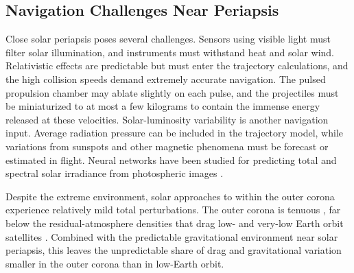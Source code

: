 \documentclass{article}
\begin{document}
\subsection{Navigation Challenges Near Periapsis}\label{sec:periapsis_challenges}
Close solar periapsis poses several challenges. Sensors using visible light must filter solar illumination, and instruments must withstand heat and solar wind. Relativistic effects are predictable but must enter the trajectory calculations, and the high collision speeds demand extremely accurate navigation. The pulsed propulsion chamber may ablate slightly on each pulse, and the projectiles must be miniaturized to at most a few kilograms to contain the immense energy released at these velocities. Solar-luminosity variability is another navigation input. Average radiation pressure can be included in the trajectory model, while variations from sunspots and other magnetic phenomena must be forecast or estimated in flight. Neural networks have been studied for predicting total and spectral solar irradiance from photospheric images \cite{muralikrishna2022solar}.

Despite the extreme environment, solar approaches to within the outer corona experience relatively mild total perturbations. The outer corona is tenuous \cite{corona_density}, far below the residual-atmosphere densities that drag low- and very-low Earth orbit satellites \cite{leo_orbit_perturbation_simulation}. Combined with the predictable gravitational environment near solar periapsis, this leaves the unpredictable share of drag and gravitational variation smaller in the outer corona than in low-Earth orbit.
  
\end{document}
